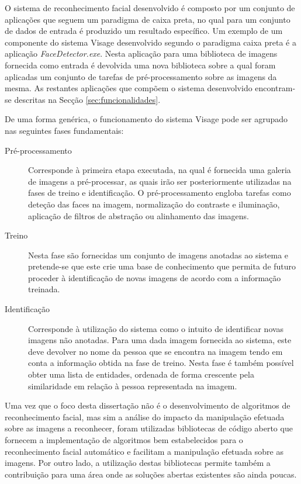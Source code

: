 O sistema de reconhecimento facial desenvolvido é composto por um conjunto de aplicações que seguem um paradigma de caixa preta, no qual para um conjunto de dados de entrada é produzido um resultado específico. Um exemplo de um componente do sistema Visage desenvolvido segundo o paradigma caixa preta é a aplicação \textit{FaceDetector.exe}. Nesta aplicação para uma biblioteca de imagens fornecida como entrada é devolvida uma nova biblioteca sobre a qual foram aplicadas um conjunto de tarefas de pré-processamento sobre as imagens da mesma. As restantes aplicações que compõem o sistema desenvolvido encontram-se descritas na Secção \ref{sec:funcionalidades}.

De uma forma genérica, o funcionamento do sistema Visage pode ser agrupado nas seguintes fases fundamentais:
\begin{description}
\item[Pré-processamento] Corresponde à primeira etapa executada, na qual é fornecida uma galeria de imagens a pré-processar, as quais irão ser posteriormente utilizadas na fases de treino e identificação. O pré-processamento engloba tarefas como deteção das faces na imagem, normalização do contraste e iluminação, aplicação de filtros de abstração ou alinhamento das imagens.
\item[Treino] Nesta fase são fornecidas um conjunto de imagens anotadas ao sistema e pretende-se que este crie uma base de conhecimento que permita de futuro proceder à identificação de novas imagens de acordo com a informação treinada.
\item[Identificação] Corresponde à utilização do sistema como o intuito de identificar novas imagens não anotadas. Para uma dada imagem fornecida ao sistema, este deve devolver no nome da pessoa que se encontra na imagem tendo em conta a informação obtida na fase de treino. Nesta fase é também possível obter uma lista de entidades, ordenada de forma crescente pela similaridade em relação à pessoa representada na imagem.
\end{description}

Uma vez que o foco desta dissertação não é o desenvolvimento de algoritmos de reconhecimento facial, mas sim a análise do impacto da manipulação efetuada sobre as imagens a reconhecer, foram utilizadas bibliotecas de código aberto que fornecem a implementação de algoritmos bem estabelecidos para o reconhecimento facial automático e facilitam a manipulação efetuada sobre as imagens. Por outro lado, a utilização destas bibliotecas permite também a contribuição para uma área onde as soluções abertas existentes são ainda poucas.

